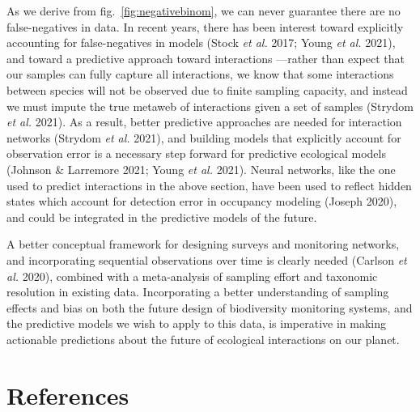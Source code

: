 \documentclass[11pt]{article}
\begin{document}
As we derive from fig.~\ref{fig:negativebinom}, we can never guarantee
there are no false-negatives in data. In recent years, there has been
interest toward explicitly accounting for false-negatives in models
(Stock \emph{et al.} 2017; Young \emph{et al.} 2021), and toward a
predictive approach toward interactions ---rather than expect that our
samples can fully capture all interactions, we know that some
interactions between species will not be observed due to finite sampling
capacity, and instead we must impute the true metaweb of interactions
given a set of samples (Strydom \emph{et al.} 2021). As a result, better
predictive approaches are needed for interaction networks (Strydom
\emph{et al.} 2021), and building models that explicitly account for
observation error is a necessary step forward for predictive ecological
models (Johnson \& Larremore 2021; Young \emph{et al.} 2021). Neural
networks, like the one used to predict interactions in the above
section, have been used to reflect hidden states which account for
detection error in occupancy modeling (Joseph 2020), and could be
integrated in the predictive models of the future.

A better conceptual framework for designing surveys and monitoring
networks, and incorporating sequential observations over time is clearly
needed (Carlson \emph{et al.} 2020), combined with a meta-analysis of
sampling effort and taxonomic resolution in existing data. Incorporating
a better understanding of sampling effects and bias on both the future
design of biodiversity monitoring systems, and the predictive models we
wish to apply to this data, is imperative in making actionable
predictions about the future of ecological interactions on our planet.

\hypertarget{references}{%
\section*{References}\label{references}}
\end{document}
